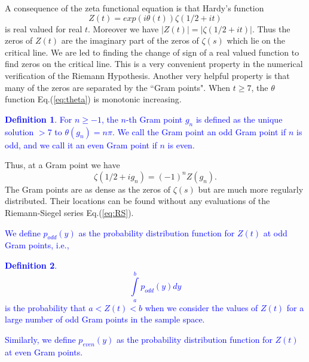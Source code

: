 \documentclass[twoside]{article}
\theoremstyle{definition}
\newtheorem{defn}{Definition}
\begin{document}
A consequence of the zeta functional equation is that Hardy's function 
\begin{equation}
Z(t)=exp(i\theta(t))\zeta(1/2 +it) 
\label{eq:hardy}
\end{equation}
is real valued for real $t$. 
Moreover we have $|Z(t)| = |\zeta(1/2+it)|$. Thus the zeros of $Z(t)$ are the imaginary part of the zeros 
of $\zeta(s)$ which lie on the critical line. We are led to finding the change of sign of a real valued function 
to find zeros on the critical line. This is a very convenient property in the numerical verification 
of the Riemann Hypothesis. Another very helpful property is that many of the zeros are separated by the
``Gram points".  When $t \ge 7$, the $\theta$ function Eq.(\ref{eq:theta}) is monotonic increasing. 
\textcolor{blue}{
\begin{defn}\label{gram}
For $n \ge -1$, the $n$-th Gram point $g_n$ is defined as the unique solution $> 7$ to
$\theta (g_n) = n\pi$. We call the Gram point an odd Gram point if $n$ is odd, and we call it an even Gram point if $n$ is even.
\end{defn}
}
Thus, at a Gram point we have
\begin{equation}
\zeta(1/2+ig_n) = (-1)^{n}Z(g_n).
\label{eq:zetagram}
\end{equation}
The Gram points are as dense as the zeros of $\zeta(s)$ but are much more regularly distributed.
Their locations can be found without any evaluations of the Riemann-Siegel series Eq.(\ref{eq:RS}).
 \textcolor{blue}{We define $p_{odd}(y)$ as the probability distribution function for $Z(t)$ at odd Gram points, i.e., 
\begin{defn}\label{podd}
\begin{equation}
\int\limits_{a}^{b} p_{odd}(y)dy
\label{eq:pdfodd}
\end{equation}
is the probability that $a<Z(t)<b$ when we consider the values of $Z(t)$ for a large number of odd Gram points in the sample space. 
\end{defn}
Similarly, we define $p_{even}(y)$ as the probability distribution function for $Z(t)$ at even Gram points. }
\end{document}

